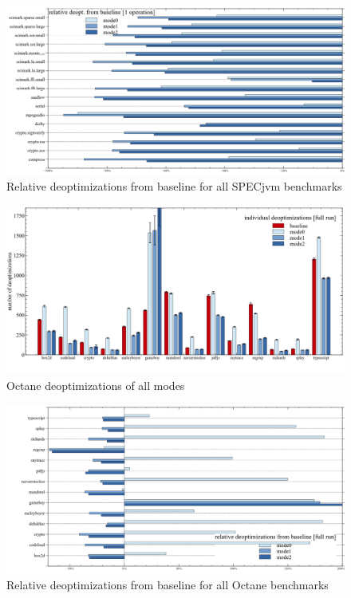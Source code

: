 \begin{figure}[ht]
  \begin{center}
    \centering
    \includegraphics[width=1.0\textwidth]{figures/all_warmup_variation_deopt.png}
    \caption{Relative deoptimizations from baseline for all SPECjvm benchmarks}
    \label{f:all_warmup_variation_deopt}
  \end{center}
\end{figure}

\begin{figure}[ht]
  \begin{center}
    \centering
    \includegraphics[width=1.0\textwidth]{figures/octane_deopt.png}
    \caption{Octane deoptimizations of all modes} 
    \label{f:octane_deopt}
  \end{center}
\end{figure}



\begin{figure}[ht]
  \begin{center}
    \centering
    \includegraphics[width=1.0\textwidth]{figures/octane_variation_deopt.png}
    \caption{Relative deoptimizations from baseline for all Octane benchmarks}
    \label{f:octane_variation_deopt}
  \end{center}
\end{figure}

